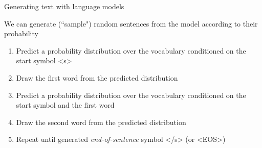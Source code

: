 \documentclass[12pt,aspectratio=169,handout]{beamer}
\begin{document}
\begin{frame}{Generating text with language models}
	
	We can generate (``sample") random sentences from the model according to their probability
	
	\begin{enumerate}
		\item Predict a probability distribution over the vocabulary conditioned on the start symbol <s>
		\item Draw the first word from the predicted distribution
		\item Predict a probability distribution over the vocabulary conditioned on the start symbol and the first word
		\item Draw the second word from the predicted distribution
		\item Repeat until generated \emph{end-of-sentence} symbol </s> (or <EOS>)
	\end{enumerate}
	
	
\end{frame}
\end{document}
